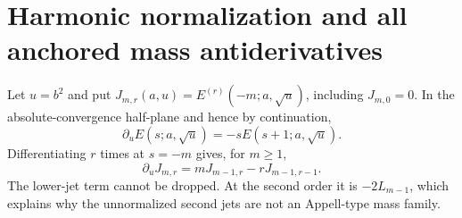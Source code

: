 \section{Harmonic normalization and all anchored mass antiderivatives}
\label{hqj:sec:mass}

Let $u=b^2$ and put $J_{m,r}(a,u)=E^{(r)}(-m;a,\sqrt u)$, including
$J_{m,0}=0$. In the absolute-convergence half-plane and hence by
continuation,
\begin{equation}\label{hqj:eq:E-mass}
\partial_uE(s;a,\sqrt u)=-sE(s+1;a,\sqrt u).
\end{equation}
Differentiating $r$ times at $s=-m$ gives, for $m\ge1$,
\begin{equation}\label{hqj:eq:raw-transport}
\partial_uJ_{m,r}=mJ_{m-1,r}-rJ_{m-1,r-1}.
\end{equation}
The lower-jet term cannot be dropped. At the second order it is
$-2L_{m-1}$, which explains why the unnormalized second jets are not an
Appell-type mass family.

